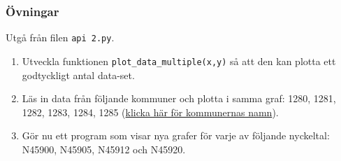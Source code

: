 \documentclass[aspectratio=169]{beamer}
\begin{document}
\begin{frame}
\frametitle{Övningar}

Utgå från filen \texttt{api 2.py}.

\begin{enumerate}
	\item Utveckla funktionen \texttt{plot\_data\_multiple(x,y)} så att den kan plotta ett godtyckligt antal data-set.
	\item Läs in data från följande kommuner och plotta i samma graf: 1280, 1281, 1282, 1283, 1284, 1285 (\href{https://skr.se/skr/tjanster/kommunerochregioner/faktakommunerochregioner/kommunkoder.2052.html}{klicka här för kommunernas namn}).
	\item Gör nu ett program som visar nya grafer för varje av följande nyckeltal: N45900, N45905, N45912 och N45920.
\end{enumerate}

\end{frame}
\end{document}
